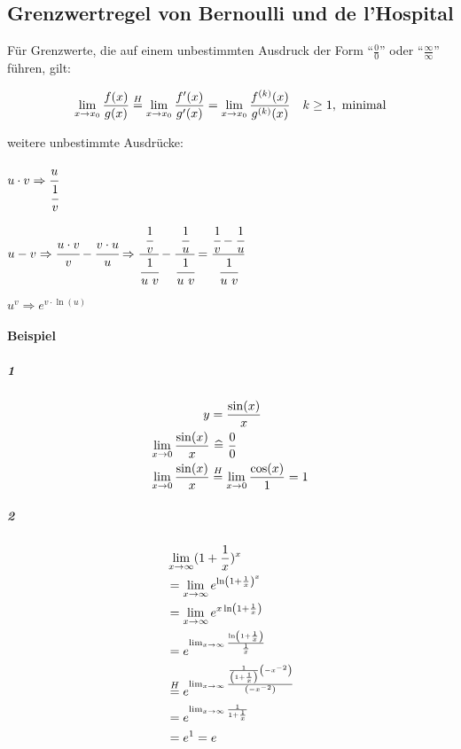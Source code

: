 \subsection{Grenzwertregel von Bernoulli und de l’Hospital}

Für Grenzwerte, die auf einem unbestimmten Ausdruck der Form \enquote{\( \frac{0}{0} \)} oder \enquote{\( \frac{\infty}{\infty} \)} führen, gilt:

\[
    \lim_{x \rightarrow x_0} \frac{f(x)}{g(x)} \overset{H}{=}
    \lim_{x \rightarrow x_0} \frac{f'(x)}{g'(x)} =
    \lim_{x \rightarrow x_0} \frac{f^{(k)}(x)}{g^{(k)}(x)}
    \quad k \geq 1,\ \text{minimal}
\]

weitere unbestimmte Ausdrücke:

\begin{description}[style=nextline]
    \item[\( 0 \cdot \infty,\ \infty \cdot 0 \)]
    \( u \cdot v
    \Rightarrow \cfrac{u}{\cfrac{1}{v}} \)
    \item[\( \infty - \infty \)]
    \( u - v
    \Rightarrow \cfrac{u \cdot v}{v} - \cfrac{v \cdot u}{u}
    \Rightarrow \cfrac{\cfrac{1}{v}}{\cfrac{1}{u\ v}} - \cfrac{\cfrac{1}{u}}{\cfrac{1}{u\ v}} = \cfrac{\cfrac{1}{v}-\cfrac{1}{u}}{\cfrac{1}{u\ v}} \)
    \item[\( 0^0,\ \infty^0,\ 1^\infty \)]
    \(
        u^v \Rightarrow e^{v \cdot \ln(u)} 
    \) 
\end{description}

\paragraph{Beispiel}

\subparagraph{1}

\begin{align*}
    y &= \frac{\sin(x)}{x} \\
    \lim_{x \rightarrow 0} \frac{\sin(x)}{x} &\ \widehat{=}\  \frac{0}{0} \\
    \lim_{x \rightarrow 0} \frac{\sin(x)}{x} &\overset{H}{=} \lim_{x \rightarrow 0} \frac{\cos(x)}{1} = 1
\end{align*}

\subparagraph{2}

\begin{align*}
    & \lim_{x \rightarrow \infty}(1 + \frac{1}{x})^x \\
    &= \lim_{x \rightarrow \infty} e^{\ln \left( 1 + \frac{1}{x} \right)^x} \\
    &= \lim_{x \rightarrow \infty} e^{x \ln \left( 1 + \frac{1}{x} \right)} \\
    &= e^{\lim_{x \rightarrow \infty} \frac{\ln \left( 1 + \frac{1}{x} \right)}{\frac{1}{x}}} \\
    &\overset{H}{=} e^{\lim_{x \rightarrow \infty} \frac{\frac{1}{\left(1 + \frac{1}{x}\right)} \left( -x^{-2} \right)}{\left( -x^{-2} \right)}} \\
    &= e^{\lim_{x \rightarrow \infty} \frac{1}{1 + \frac{1}{x}}} \\
    &= e^1 = e
\end{align*}
